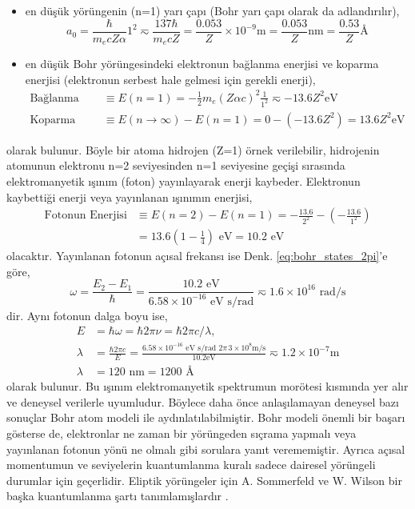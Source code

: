 \documentclass[a4paper,12pt, twoside]{article}
\begin{document}
\begin{itemize}
\item en düşük yörüngenin (n=1) yarı çapı (Bohr yarı çapı olarak da adlandırılır),
\begin{equation}
a_0 = \frac{\hbar}{m_e c Z \alpha} 1^2 \eqsim \frac{137\hbar}{m_e c Z} = \frac{0.053}{Z}\times 10^{-9} \text{m} = \frac{0.053}{Z} \text{nm} = \frac{0.53}{Z} \text{\AA}
\label{eq:bohr_radius}
\end{equation}

\item en düşük Bohr yörüngesindeki elektronun bağlanma enerjisi ve koparma enerjisi (elektronun serbest hale gelmesi için gerekli enerji),
\begin{align}
\text{Bağlanma Enerjisi} &\equiv E(n=1) = -\frac{1}{2}m_e (Z \alpha c)^2 \frac{1}{1^2} \eqsim -13.6 Z^2 \text{eV} \\
\text{Koparma Enerjisi} &\equiv E(n\rightarrow\infty) - E(n=1) = 0 - (-13.6 Z^2) = 13.6 Z^2 \text{eV}
\label{eq:bindingEnergy}
\end{align}
\end{itemize}
olarak bulunur. Böyle bir atoma hidrojen (Z=1) örnek verilebilir, hidrojenin atomunun elektronu n=2 seviyesinden n=1 seviyesine geçişi sırasında elektromanyetik ışınım (foton) yayınlayarak enerji kaybeder. Elektronun kaybettiği enerji veya yayınlanan ışınımın enerjisi,
\begin{align}
\text{Fotonun Enerjisi} &\equiv E(n=2) - E(n=1) 
= -\frac{13.6}{2^2} - (-\frac{13.6}{1^2}) \nonumber \\ 
&=  13.6 (1-\frac{1}{4}) \text{ eV} = 10.2 \text{ eV}
\label{eq:fotonEnergy}
\end{align}
olacaktır. Yayınlanan fotonun açısal frekansı ise Denk. \ref{eq:bohr_states_2pi}'e göre,
\begin{equation*}
\omega = \frac{E_2 - E_1}{\hbar} = \frac{10.2 \text{ eV}}{6.58\times 10^{-16} \text{ eV s/rad}} \eqsim 1.6 \times 10^{16} \text{ rad/s}
\end{equation*}
dir. Aynı fotonun dalga boyu ise,
\begin{align*}
E &= \hbar \omega = \hbar 2\pi \nu = \hbar 2\pi c/\lambda, \\
\lambda &= \frac{\hbar 2\pi c}{E} = 
\frac{6.58\times 10^{-16} \text{ eV s/rad } 2\pi\,3\times 10^8 \text{m/s}}{10.2 \text{eV}}\eqsim 1.2\times 10^{-7} \text{m}\\
\lambda &= 120 \text{ nm} = 1200 \text{ \AA} 
\end{align*}
olarak bulunur. Bu ışınım elektromanyetik spektrumun morötesi kısmında yer alır ve deneysel verilerle uyumludur. Böylece daha önce anlaşılamayan deneysel bazı sonuçlar Bohr atom modeli ile aydınlatılabilmiştir. Bohr modeli önemli bir başarı gösterse de, elektronlar ne zaman bir yörüngeden sıçrama yapmalı veya yayınlanan fotonun yönü ne olmalı gibi sorulara yanıt verememiştir. Ayrıca açısal momentumun ve seviyelerin kuantumlanma kuralı sadece dairesel yörüngeli durumlar için geçerlidir. Eliptik yörüngeler için A. Sommerfeld ve W. Wilson bir başka kuantumlanma şartı tanımlamışlardır \cite{book:Gasiorowicz, book:EisbergResnick}. 
\end{document}
